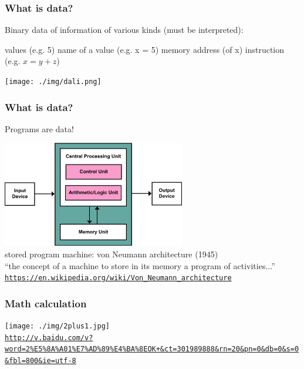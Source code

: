 \documentclass[11pt]{beamer}
\begin{document}
\begin{frame}
  \frametitle{What is data?}
  \Enlarge

  \begin{itemize}
    \myitem Binary data of information of various kinds (must be interpreted):
	\begin{itemize}
	  \mysubitem values (e.g. 5) %
	  \mysubitem name of a value (e.g. x = 5) %
	  \mysubitem memory address (of x) %
	  \mysubitem instruction (e.g. $x = y + z$) %
	\end{itemize}
  \end{itemize}
  \begin{centering}
  \hspace{15mm}\texttt{[image: ./img/dali.png]}
  \end{centering}
\end{frame}

\begin{frame}
  \frametitle{What is data?}
  \Enlarge

  \begin{itemize}
      \myitem Programs are data! \pause
  \end{itemize}
  \begin{center}
  \includegraphics[width=0.6\textwidth]{./img/Von_Neumann.png}\\
  stored program machine: von Neumann architecture (1945)\\
  \textcolor{\CSGradBot}{``the concept of a machine to store in its memory a program of activities...''}
  \textcolor{\CSBase}{\small \texttt{\url{https://en.wikipedia.org/wiki/Von_Neumann_architecture}}}
  \end{center}
\end{frame}

\begin{frame}[fragile]
	\frametitle{Math calculation}
	\centering
	\texttt{[image: ./img/2plus1.jpg]}\\
	\textcolor{\CSBase}{\small \texttt{\url{http://v.baidu.com/v?word=2\%E5\%8A\%A01\%E7\%AD\%89\%E4\%BA\%8EOK+\&ct=301989888\&rn=20\&pn=0\&db=0\&s=0\&fbl=800\&ie=utf-8}}}
\end{frame}
\end{document}
